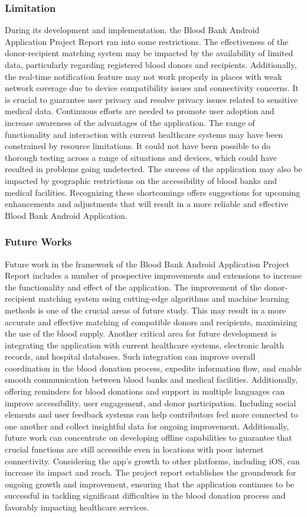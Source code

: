 \subsubsection{Limitation}
During its development and implementation, the Blood Bank Android
Application Project Report ran into some restrictions. The effectiveness
of the donor-recipient matching system may be impacted by the
availability of limited data, particularly regarding registered blood
donors and recipients. Additionally, the real-time notification feature
may not work properly in places with weak network coverage due to
device compatibility issues and connectivity concerns. It is crucial to
guarantee user privacy and resolve privacy issues related to sensitive
medical data. Continuous efforts are needed to promote user adoption
and increase awareness of the advantages of the application. The range
of functionality and interaction with current healthcare systems may
have been constrained by resource limitations. It could not have been
possible to do thorough testing across a range of situations and devices,
which could have resulted in problems going undetected. The success of
the application may also be impacted by geographic restrictions on the
accessibility of blood banks and medical facilities. Recognizing these
shortcomings offers suggestions for upcoming enhancements and
adjustments that will result in a more reliable and effective Blood Bank
Android Application.
\subsubsection{Future Works}
Future work in the framework of the Blood Bank Android Application
Project Report includes a number of prospective improvements and
extensions to increase the functionality and effect of the application. The
improvement of the donor-recipient matching system using cutting-edge
algorithms and machine learning methods is one of the crucial areas of
future study. This may result in a more accurate and effective matching
of compatible donors and recipients, maximizing the use of the blood
supply. Another critical area for future development is integrating the
application with current healthcare systems, electronic health records,
and hospital databases. Such integration can improve overall
coordination in the blood donation process, expedite information flow,
and enable smooth communication between blood banks and medical
facilities. Additionally, offering reminders for blood donations and
support in multiple languages can improve accessibility, user
engagement, and donor participation. Including social elements and user
feedback systems can help contributors feel more connected to one
another and collect insightful data for ongoing improvement.
Additionally, future work can concentrate on developing offline
capabilities to guarantee that crucial functions are still accessible even in
locations with poor internet connectivity. Considering the app's growth
to other platforms, including iOS, can increase its impact and reach. The project report establishes the groundwork for ongoing growth and
improvement, ensuring that the application continues to be successful in tackling significant difficulties in the blood donation process and
favorably impacting healthcare services.

